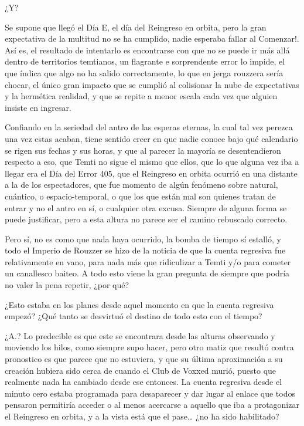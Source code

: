 \documentclass[
]{book}
\begin{document}
¿Y?

Se supone que llegó el Día E, el día del Reingreso en orbita, pero la gran expectativa de la multitud no se ha cumplido, nadie esperaba fallar al Comenzar!. Así es, el resultado de intentarlo es encontrarse con que no se puede ir más allá dentro de territorios temtianos, un flagrante e sorprendente error lo impide, el que índica que algo no ha salido correctamente, lo que en jerga rouzzera sería chocar, el único gran impacto que se cumplió al colisionar la nube de expectativas y la hermética realidad, y que se repite a menor escala cada vez que alguien insiste en ingresar.

Confiando en la seriedad del antro de las esperas eternas, la cual tal vez perezca una vez estas acaban, tiene sentido creer en que nadie conoce bajo qué calendario se rigen sus fechas y sus horas, y que al parecer la mayoría se desentendieron respecto a eso, que Temti no sigue el mismo que ellos, que lo que alguna vez iba a llegar era el Día del Error 405, que el Reingreso en orbita ocurrió en una distante a la de los espectadores, que fue momento de algún fenómeno sobre natural, cuántico, o espacio-temporal, o que los que están mal son quienes tratan de entrar y no el antro en sí, o cualquier otra excusa. Siempre de alguna forma se puede justificar, pero a esta altura no parece ser el camino rebuscado correcto.

Pero sí, no es como que nada haya ocurrido, la bomba de tiempo sí estalló, y todo el Imperio de Rouzzer se hizo de la noticia de que la cuenta regresiva fue relativamente en vano, para nada más que ridiculizar a Temti y/o para cometer un canallesco baiteo. A todo esto viene la gran pregunta de siempre que podría no valer la pena repetir, ¿por qué?

¿Esto estaba en los planes desde aquel momento en que la cuenta regresiva empezó? ¿Qué tanto se desvirtuó el destino de todo esto con el tiempo?

¿A.? Lo predecible es que este se encontrara desde las alturas observando y moviendo los hilos, como siempre supo hacer, pero otro matiz que resultó contra pronostico es que parece que no estuviera, y que su última aproximación a su creación hubiera sido cerca de cuando el Club de Voxxed murió, puesto que realmente nada ha cambiado desde ese entonces. La cuenta regresiva desde el minuto cero estaba programada para desaparecer y dar lugar al enlace que todos pensaron permitiría acceder o al menos acercarse a aquello que iba a protagonizar el Reingreso en orbita, y a la vista está que el pase\ldots{} ¿no ha sido habilitado?
\end{document}
